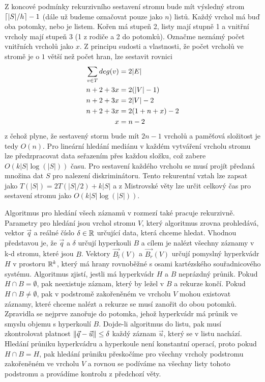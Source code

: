 Z koncové podmínky rekurzivního sestavení stromu bude mít výsledný strom $\lceil|S|/h\rceil- 1$ (dále už budeme označovat pouze jako $n$) listů. Každý vrchol má buď oba potomky, nebo je listem. Kořen má stupeň 2, listy mají stupně 1 a vnitřní vrcholy mají stupeň 3 (1 z rodiče a 2 do potomků). Označme neznámý počet vnitřních vrcholů jako $x$. Z principu sudosti a vlastnosti, že počet vrcholů ve stromě je o $1$ větší než počet hran, lze sestavit rovnici
\begin{align}
  \label{eq:kd-tree-vertex-count}
  \sum_{v \in T}deg(v) &= 2|E|\notag\\
            n + 2 + 3x &= 2(|V|-1)\notag\\
            n + 2 + 3x &= 2|V|-2\notag\\
            n + 2 + 3x &= 2(1+n+x)-2\notag\\
                     x &= n-2\notag
\end{align}
z čehož plyne, že sestavený storm bude mít $2n - 1$ vrcholů a paměťová složitost je tedy $O(n)$. Pro lineární hledání mediánu v každém vytváření vrcholu stromu lze předzpracovat data seřazením přes každou složku, což zabere $O(k|S|\log(|S|))$ času. Pro sestavení každého vrcholu se musí projít předaná množina dat $S$ pro nalezení diskriminátoru. Tento rekurentní vztah lze zapsat jako $T(|S|) = 2T(|S|/2) + k|S|$ a z Mistrovské věty lze určit celkový čas pro sestavení stromu jako $O(k|S|\log(|S|))$.

Algoritmus pro hledání všech záznamů v rozmezí také pracuje rekurzivně. Parametry pro hledání jsou vrchol stromu $V$, který algoritmus zrovna prohledává, vektor $\vec{q}$ a reálné číslo $\delta \in \mathbb{R}$ určující data, která chceme hledat. Vhodnou představou je, že $\vec{q}$ a $\delta$ určují hyperkouli $B$ a cílem je nalézt všechny záznamy v k-d stromu, které jsou  $B$. Vektory $\vec{B_l}(V)$ a $\vec{B_r}(V)$ určují pomyslný hyperkvádr $H$ v prostoru $\mathbb{R}^k$, který má hrany rovnoběžné s osami kartézského souřadnicového systému. Algoritmus zjistí, jestli má hyperkvádr $H$ a $B$ neprázdný průnik. Pokud $H \cap B = \emptyset$, pak neexistuje záznam, který by ležel v $B$ a rekurze končí. Pokud $H \cap B \neq \emptyset$, pak v podstromě zakořeněném ve vrcholu $V$ mohou existovat záznamy, které chceme nalézt a rekurze se musí zanořit do obou potomků. Zpravidla se nejprve zanořuje do potomka, jehož hyperkvádr má  průnik ve smyslu objemu s hyperkoulí $B$. Dojde-li algoritmus do listu, pak musí zkontrolovat platnost $\|\vec{q} - \vec{u}\| \leq \delta$ každý záznam $\vec{u}$, který se v listu nachází. Hledání průniku hyperkvádru a hyperkoule není konstantní operací, proto pokud $H \cap B = H$, pak hledání průniku přeskočíme pro všechny vrcholy podstromu zakořeněném ve vrcholu $V$ a rovnou se podíváme na všechny listy tohoto podstromu a provádíme kontrolu z předchozí věty.

